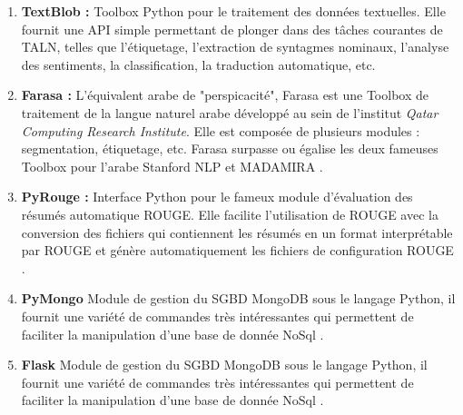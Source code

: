 \begin{enumerate}[leftmargin=*]
                \item{\textbf{TextBlob : }}
                Toolbox Python pour le traitement des données textuelles. Elle fournit une API simple permettant de plonger dans des tâches courantes de TALN, telles que l'étiquetage, l'extraction de syntagmes nominaux, l'analyse des sentiments, la classification, la traduction automatique, etc. \cite{textblob}\\

                \item{\textbf{Farasa : }}
                L'équivalent arabe de "perspicacité", Farasa est une Toolbox de traitement de la langue naturel arabe développé au sein de l'institut \emph{Qatar Computing Research Institute}. Elle est composée de plusieurs modules : segmentation, étiquetage, etc. Farasa surpasse ou égalise les deux fameuses Toolbox pour l'arabe Stanford NLP et MADAMIRA \cite{farasa}.\\

                \item{\textbf{PyRouge : }}
                Interface Python pour le fameux module d'évaluation des résumés automatique ROUGE. Elle facilite l'utilisation de ROUGE avec la conversion des fichiers qui contiennent les résumés en un format interprétable par ROUGE et génère automatiquement les fichiers de configuration ROUGE \cite{pyrouge}.\\

                \item{\textbf{PyMongo}}
                Module de gestion du SGBD MongoDB sous le langage Python, il fournit une variété de commandes très intéressantes qui permettent de faciliter la manipulation d'une base de donnée NoSql \cite{pymongo}.\\

                \item{\textbf{Flask}}\label{flask}
                Module de gestion du SGBD MongoDB sous le langage Python, il fournit une variété de commandes très intéressantes qui permettent de faciliter la manipulation d'une base de donnée NoSql \cite{pymongo}.\\

            \end{enumerate}

